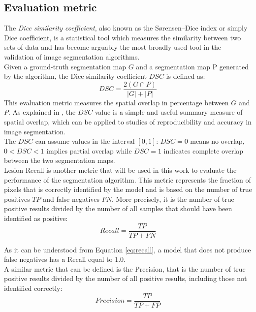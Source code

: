 \documentclass[12pt]{extarticle}
\begin{document}
\subsection{Evaluation metric}\label{sec:evaluation_metric}
The \emph{Dice similarity coefficient}, also known as the Sørensen–Dice index or simply Dice coefficient, is a statistical tool which measures the similarity between two sets of data and has become arguably the most broadly used tool in the validation of image segmentation algorithms.\\
Given a ground-truth segmentation map $G$ and a segmentation map P generated by the algorithm, the Dice similarity coefficient $DSC$ is defined as:
\begin{equation}
DSC = \dfrac{2\left( G \cap P  \right)}{\left| G \right| + \left| P \right|}
\end{equation}
This evaluation metric measures the spatial overlap in percentage between $G$ and $P$.
As explained in \cite{dice_coef}, the $DSC$ value is a simple and useful summary measure of spatial overlap, which can be applied to studies of reproducibility and accuracy in image segmentation.\\
The $DSC$ can assume values in the interval $\left[ 0 , 1 \right]$: $DSC=0$ means no overlap, $0<DSC<1$ implies partial overlap while $DSC=1$ indicates complete overlap between the two segmentation maps.\\[4pt]
Lesion Recall is another metric that will be used in this work to evaluate the performance of the segmentation algorithm. This metric represents the fraction of pixels that is correctly identified by the model and is based on the number of true positives $TP$ and false negatives $FN$. More precisely, it is the number of true positive results divided by the number of all samples that should have been identified as positive:
\begin{equation}
Recall = \dfrac{TP}{TP+FN}
\label{eq:recall}
\end{equation}

\noindent As it can be understood from Equation \eqref{eq:recall}, a model that does not produce false negatives has a Recall equal to $1.0$.\\[4pt]
A similar metric that can be defined is the Precision, that is the number of true positive results divided by the number of all positive results, including those not identified correctly: 
\begin{equation}
Precision = \dfrac{TP}{TP+FP}
\label{eq:precision}
\end{equation}
\end{document}
